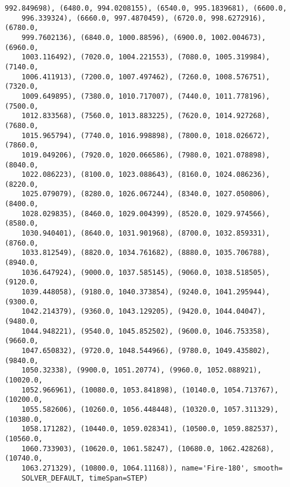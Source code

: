 \documentclass[12pt, letterpaper, oneside]{report}
\begin{document}
\begin{lstlisting}[frame=none]
    992.849698), (6480.0, 994.0208155), (6540.0, 995.1839681), (6600.0, 
    996.339324), (6660.0, 997.4870459), (6720.0, 998.6272916), (6780.0, 
    999.7602136), (6840.0, 1000.88596), (6900.0, 1002.004673), (6960.0, 
    1003.116492), (7020.0, 1004.221553), (7080.0, 1005.319984), (7140.0, 
    1006.411913), (7200.0, 1007.497462), (7260.0, 1008.576751), (7320.0, 
    1009.649895), (7380.0, 1010.717007), (7440.0, 1011.778196), (7500.0, 
    1012.833568), (7560.0, 1013.883225), (7620.0, 1014.927268), (7680.0, 
    1015.965794), (7740.0, 1016.998898), (7800.0, 1018.026672), (7860.0, 
    1019.049206), (7920.0, 1020.066586), (7980.0, 1021.078898), (8040.0, 
    1022.086223), (8100.0, 1023.088643), (8160.0, 1024.086236), (8220.0, 
    1025.079079), (8280.0, 1026.067244), (8340.0, 1027.050806), (8400.0, 
    1028.029835), (8460.0, 1029.004399), (8520.0, 1029.974566), (8580.0, 
    1030.940401), (8640.0, 1031.901968), (8700.0, 1032.859331), (8760.0, 
    1033.812549), (8820.0, 1034.761682), (8880.0, 1035.706788), (8940.0, 
    1036.647924), (9000.0, 1037.585145), (9060.0, 1038.518505), (9120.0, 
    1039.448058), (9180.0, 1040.373854), (9240.0, 1041.295944), (9300.0, 
    1042.214379), (9360.0, 1043.129205), (9420.0, 1044.04047), (9480.0, 
    1044.948221), (9540.0, 1045.852502), (9600.0, 1046.753358), (9660.0, 
    1047.650832), (9720.0, 1048.544966), (9780.0, 1049.435802), (9840.0, 
    1050.32338), (9900.0, 1051.20774), (9960.0, 1052.088921), (10020.0, 
    1052.966961), (10080.0, 1053.841898), (10140.0, 1054.713767), (10200.0, 
    1055.582606), (10260.0, 1056.448448), (10320.0, 1057.311329), (10380.0, 
    1058.171282), (10440.0, 1059.028341), (10500.0, 1059.882537), (10560.0, 
    1060.733903), (10620.0, 1061.58247), (10680.0, 1062.428268), (10740.0, 
    1063.271329), (10800.0, 1064.11168)), name='Fire-180', smooth=
    SOLVER_DEFAULT, timeSpan=STEP)
	

\end{lstlisting}
\end{document}
